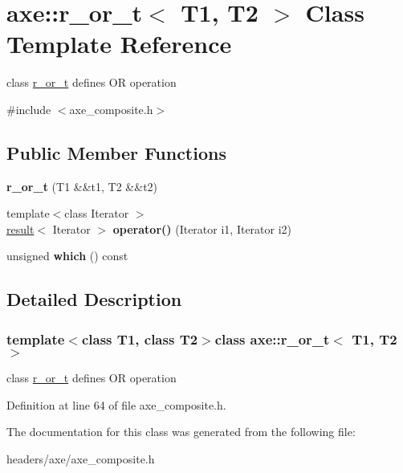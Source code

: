 \hypertarget{classaxe_1_1r__or__t}{\section{axe\+:\+:r\+\_\+or\+\_\+t$<$ T1, T2 $>$ Class Template Reference}
\label{classaxe_1_1r__or__t}
}


class \hyperlink{classaxe_1_1r__or__t}{r\+\_\+or\+\_\+t} defines O\+R operation  




{\ttfamily \#include $<$axe\+\_\+composite.\+h$>$}

\subsection*{Public Member Functions}
\begin{DoxyCompactItemize}
\item 
\hypertarget{classaxe_1_1r__or__t_a8fe2328943c29388408e225604464bf5}{{\bfseries r\+\_\+or\+\_\+t} (T1 \&\&t1, T2 \&\&t2)}\label{classaxe_1_1r__or__t_a8fe2328943c29388408e225604464bf5}

\item 
\hypertarget{classaxe_1_1r__or__t_adc28fc61e837058d5ee551a0ceaef2b0}{{\footnotesize template$<$class Iterator $>$ }\\\hyperlink{structaxe_1_1result}{result}$<$ Iterator $>$ {\bfseries operator()} (Iterator i1, Iterator i2)}\label{classaxe_1_1r__or__t_adc28fc61e837058d5ee551a0ceaef2b0}

\item 
\hypertarget{classaxe_1_1r__or__t_ac63cd40510c3e9859097050c88d8c7e7}{unsigned {\bfseries which} () const }\label{classaxe_1_1r__or__t_ac63cd40510c3e9859097050c88d8c7e7}

\end{DoxyCompactItemize}


\subsection{Detailed Description}
\subsubsection*{template$<$class T1, class T2$>$class axe\+::r\+\_\+or\+\_\+t$<$ T1, T2 $>$}

class \hyperlink{classaxe_1_1r__or__t}{r\+\_\+or\+\_\+t} defines O\+R operation 

Definition at line 64 of file axe\+\_\+composite.\+h.



The documentation for this class was generated from the following file\+:\begin{DoxyCompactItemize}
\item 
headers/axe/axe\+\_\+composite.\+h\end{DoxyCompactItemize}
